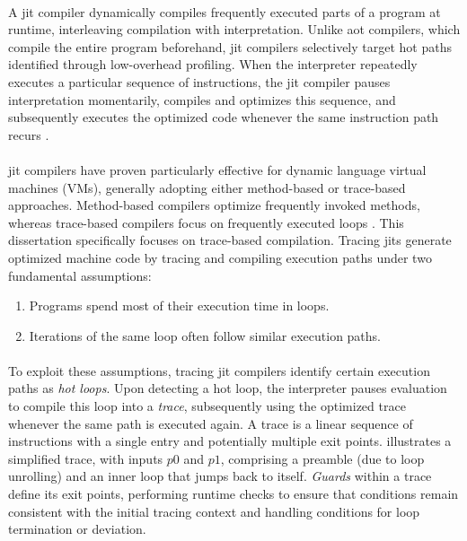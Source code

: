     \paragraph{}%
        A \gls{jit} compiler dynamically compiles frequently executed parts of a program at runtime, interleaving compilation with interpretation. Unlike \gls{aot} compilers, which compile the entire program beforehand, \gls{jit} compilers selectively target hot paths identified through low-overhead profiling. When the interpreter repeatedly executes a particular sequence of instructions, the \gls{jit} compiler pauses interpretation momentarily, compiles and optimizes this sequence, and subsequently executes the optimized code whenever the same instruction path recurs \cite{dynamo}.

    \paragraph{}%
        \gls{jit} compilers have proven particularly effective for dynamic language virtual machines (VMs), generally adopting either method-based or trace-based approaches. Method-based compilers optimize frequently invoked methods, whereas trace-based compilers focus on frequently executed loops \cite{survey:05,jit-history:03}. This dissertation specifically focuses on trace-based compilation. Tracing \glspl{jit} generate optimized machine code by tracing and compiling execution paths under two fundamental assumptions\cite{pypy-main}:

    \begin{enumerate}
        \item Programs spend most of their execution time in loops.
        \item Iterations of the same loop often follow similar execution paths.
    \end{enumerate}


    \paragraph{}%
        To exploit these assumptions, tracing \gls{jit} compilers identify certain execution paths as \emph{hot loops}. Upon detecting a hot loop, the interpreter pauses evaluation to compile this loop into a \emph{trace}, subsequently using the optimized trace whenever the same path is executed again. A trace is a linear sequence of instructions with a single entry and potentially multiple exit points.  illustrates a simplified trace, with inputs $p0$ and $p1$, comprising a preamble (due to loop unrolling) and an inner loop that jumps back to itself. \emph{Guards} within a trace define its exit points, performing runtime checks to ensure that conditions remain consistent with the initial tracing context and handling conditions for loop termination or deviation.

